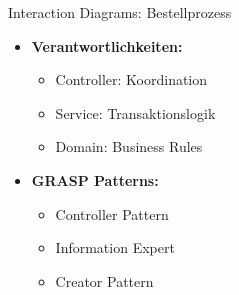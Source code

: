 \begin{example2}[breakable]{Interaction Diagrams: Bestellprozess}
\begin{itemize}
    \item \textbf{Verantwortlichkeiten:}
    \begin{itemize}
        \item Controller: Koordination
        \item Service: Transaktionslogik
        \item Domain: Business Rules
    \end{itemize}
    
    \item \textbf{GRASP Patterns:}
    \begin{itemize}
        \item Controller Pattern
        \item Information Expert
        \item Creator Pattern
    \end{itemize}
\end{itemize}
\end{example2}